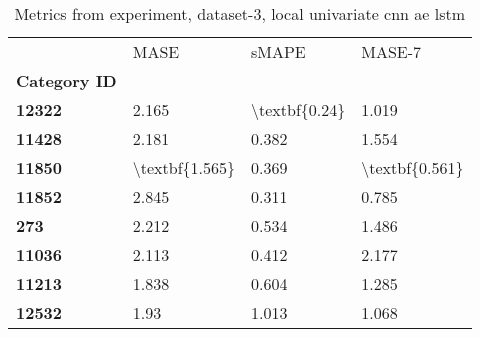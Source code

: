 \begin{table}[h]
\centering
\caption{Metrics from experiment, dataset-3, local univariate cnn ae lstm}
\label{table:local-univariate-cnn-ae-lstm-dataset-3}
\begin{tabular}{llll}
\toprule
{} &            MASE &          sMAPE &          MASE-7 \\
\textbf{Category ID} &                 &                &                 \\
\midrule
\textbf{12322      } &           2.165 &  \textbackslash textbf\{0.24\} &           1.019 \\
\textbf{11428      } &           2.181 &          0.382 &           1.554 \\
\textbf{11850      } &  \textbackslash textbf\{1.565\} &          0.369 &  \textbackslash textbf\{0.561\} \\
\textbf{11852      } &           2.845 &          0.311 &           0.785 \\
\textbf{273        } &           2.212 &          0.534 &           1.486 \\
\textbf{11036      } &           2.113 &          0.412 &           2.177 \\
\textbf{11213      } &           1.838 &          0.604 &           1.285 \\
\textbf{12532      } &            1.93 &          1.013 &           1.068 \\
\bottomrule
\end{tabular}
\end{table}
